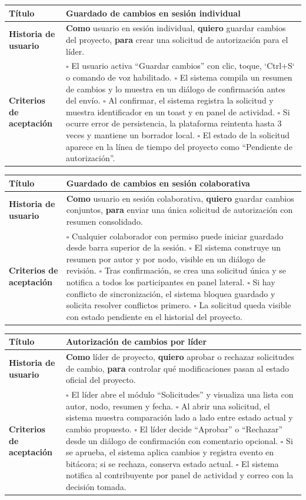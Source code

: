 \documentclass{article}
\newcommand{\story}[3]{
\begin{table}[H]
    \centering
    \begin{tabularx}{\textwidth}{| >{\raggedright\arraybackslash\bfseries\columncolor{leftheaderbg}}p{2.5cm} | >{\raggedright\arraybackslash\columncolor{contentbg}}X |}
        \hline
        Título & #1 \\
        \hline
        Historia de usuario & #2 \\
        \hline
        Criterios de aceptación & #3 \\
        \hline
    \end{tabularx}
\end{table}
}
\begin{document}
\story
{Guardado de cambios en sesión individual}
{\textbf{Como} usuario en sesión individual, \textbf{quiero} guardar cambios del proyecto, \textbf{para} crear una solicitud de autorización para el líder.}
{$\square$ El usuario activa ``Guardar cambios'' con clic, toque, `Ctrl+S` o comando de voz habilitado. \newline
$\square$ El sistema compila un resumen de cambios y lo muestra en un diálogo de confirmación antes del envío. \newline
$\square$ Al confirmar, el sistema registra la solicitud y muestra identificador en un toast y en panel de actividad. \newline
$\square$ Si ocurre error de persistencia, la plataforma reintenta hasta 3 veces y mantiene un borrador local. \newline
$\square$ El estado de la solicitud aparece en la línea de tiempo del proyecto como ``Pendiente de autorización''.}

\story
{Guardado de cambios en sesión colaborativa}
{\textbf{Como} usuario en sesión colaborativa, \textbf{quiero} guardar cambios conjuntos, \textbf{para} enviar una única solicitud de autorización con resumen consolidado.}
{$\square$ Cualquier colaborador con permiso puede iniciar guardado desde barra superior de la sesión. \newline
$\square$ El sistema construye un resumen por autor y por nodo, visible en un diálogo de revisión. \newline
$\square$ Tras confirmación, se crea una solicitud única y se notifica a todos los participantes en panel lateral. \newline
$\square$ Si hay conflicto de sincronización, el sistema bloquea guardado y solicita resolver conflictos primero. \newline
$\square$ La solicitud queda visible con estado pendiente en el historial del proyecto.}

\story
{Autorización de cambios por líder}
{\textbf{Como} líder de proyecto, \textbf{quiero} aprobar o rechazar solicitudes de cambio, \textbf{para} controlar qué modificaciones pasan al estado oficial del proyecto.}
{$\square$ El líder abre el módulo ``Solicitudes'' y visualiza una lista con autor, nodo, resumen y fecha. \newline
$\square$ Al abrir una solicitud, el sistema muestra comparación lado a lado entre estado actual y cambio propuesto. \newline
$\square$ El líder decide ``Aprobar'' o ``Rechazar'' desde un diálogo de confirmación con comentario opcional. \newline
$\square$ Si se aprueba, el sistema aplica cambios y registra evento en bitácora; si se rechaza, conserva estado actual. \newline
$\square$ El sistema notifica al contribuyente por panel de actividad y correo con la decisión tomada.}
\end{document}
